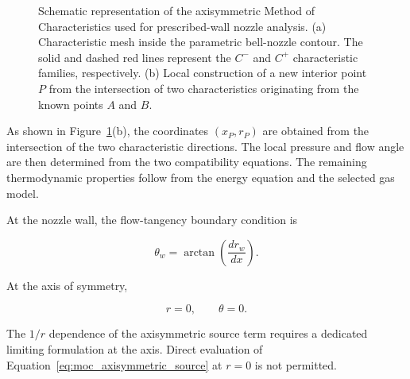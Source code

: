 \begin{figure}[htbp]
{%
}

\caption{
Schematic representation of the axisymmetric Method of
Characteristics used for prescribed-wall nozzle analysis.
(a) Characteristic mesh inside the parametric bell-nozzle contour.
The solid and dashed red lines represent the $C^-$ and $C^+$
characteristic families, respectively.
(b) Local construction of a new interior point $P$ from the
intersection of two characteristics originating from the known
points $A$ and $B$.
}

\label{fig:prescribed_wall_moc_mesh}

\end{figure}

As shown in Figure~\ref{fig:prescribed_wall_moc_mesh}(b), the
coordinates $(x_P,r_P)$ are obtained from the intersection of the
two characteristic directions. The local pressure and flow angle are
then determined from the two compatibility equations. The remaining
thermodynamic properties follow from the energy equation and the
selected gas model.

At the nozzle wall, the flow-tangency boundary condition is

\begin{equation}
    \boxed{
    \theta_w
    =
    \arctan\left(\frac{dr_w}{dx}\right)
    }.
    \label{eq:moc_wall_condition}
\end{equation}

At the axis of symmetry,

\begin{equation}
    \boxed{
    r=0,
    \qquad
    \theta=0
    }.
    \label{eq:moc_axis_condition}
\end{equation}

The $1/r$ dependence of the axisymmetric source term requires a
dedicated limiting formulation at the axis. Direct evaluation of
Equation~\eqref{eq:moc_axisymmetric_source} at $r=0$ is not permitted.

